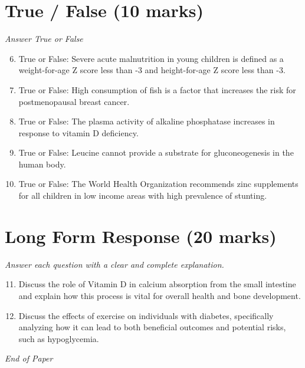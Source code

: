 \documentclass[12pt]{article}
\begin{document}
\section*{True / False (10 marks)}
\textit{Answer True or False}
\begin{enumerate}[label=\arabic*.]
\setcounter{enumi}{5}
\item True or False: Severe acute malnutrition in young children is defined as a weight-for-age Z score less than -3 and height-for-age Z score less than -3.
\item True or False: High consumption of fish is a factor that increases the risk for postmenopausal breast cancer.
\item True or False: The plasma activity of alkaline phosphatase increases in response to vitamin D deficiency.
\item True or False: Leucine cannot provide a substrate for gluconeogenesis in the human body.
\item True or False: The World Health Organization recommends zinc supplements for all children in low income areas with high prevalence of stunting.
\end{enumerate}

\section*{Long Form Response (20 marks)}
\textit{Answer each question with a clear and complete explanation.}
\begin{enumerate}[label=\arabic*.]
\setcounter{enumi}{10}
\item Discuss the role of Vitamin D in calcium absorption from the small intestine and explain how this process is vital for overall health and bone development.
\item Discuss the effects of exercise on individuals with diabetes, specifically analyzing how it can lead to both beneficial outcomes and potential risks, such as hypoglycemia.
\end{enumerate}

\vfill
\noindent\textit{End of Paper}
\end{document}
